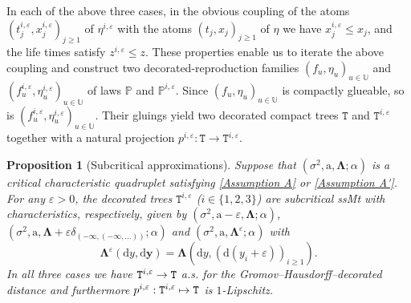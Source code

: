 \documentclass[12pt]{article}
\numberwithin{equation}{section}
\theoremstyle{plain}
\newtheorem{prop}[thm]{Proposition}
\theoremstyle{definition}
\newcommand{\D}{\mathrm{d}}
\newcommand{\Bd}[1]{\boldsymbol{#1}}
\begin{document}
In each of the above three cases, in the obvious coupling of the atoms $(t_j^{i, \varepsilon}, x_j^{i, \varepsilon})_{j \geq 1}$ of $\eta^{i, \varepsilon}$ with the atoms $(t_j, x_j)_{j\geq 1}$ of $\eta$ we have $x_j^{i, \varepsilon} \leq x_j$, and the life times satisfy $z^{i, \varepsilon} \leq z$. These properties enable us to iterate the above coupling and construct two decorated-reproduction families $(f_u, \eta_u)_{u\in\mathbb{U}}$ and $(f_u^{i, \varepsilon}, \eta_u^{i, \varepsilon})_{u\in\mathbb{U}}$ of laws $\mathbb{P}$ and $\mathbb{P}^{i, \varepsilon}$. Since $(f_u, \eta_u)_{u\in\mathbb{U}}$ is compactly glueable, so is $(f_u^{i, \varepsilon}, \eta_u^{i, \varepsilon})_{u\in\mathbb{U}}$. Their gluings yield two decorated compact trees $\mathtt{T}$ and $\mathtt{T}^{i, \varepsilon}$ together with a natural projection
$ p^{i, \varepsilon} : \mathtt{T} \to \mathtt{T}^{i, \varepsilon}.$

\begin{prop}[Subcritical approximations]\label{prop: approximate critical from subcritical} Suppose that  $(\sigma^2, \mathrm{a}, \boldsymbol\Lambda ; \alpha)$ is a critical characteristic quadruplet satisfying \cref{Assumption A} or \cref{Assumption A'}. For any $ \varepsilon >0$, the decorated trees $\mathtt{T}^{i, \varepsilon}$ ($i \in \{1,2,3\}$) are subcritical ssMt with characteristics, respectively, given by  $(\sigma^2, \mathrm{a}-\varepsilon, \Bd\Lambda;\alpha)$, $(\sigma^2, \mathrm{a}, \Bd\Lambda + \varepsilon\delta_{(-\infty, (-\infty,\ldots))};\alpha)$ and $(\sigma^2, \mathrm{a}, \Bd\Lambda^{\varepsilon};\alpha)$ with
    \[\Bd\Lambda^{\varepsilon}(\D y, \D\Bd y) = \Bd\Lambda(\D y, (\D(y_i + \varepsilon))_{i\geq 1}).\]
In all three cases we have  ${\tt T}^{i, \varepsilon} \to \tt T$ a.s. for the Gromov--Hausdorff--decorated distance and furthermore $p^{i, \varepsilon} : {\tt T}^{i, \varepsilon} \mapsto \tt T$ is $1$-Lipschitz.
\end{prop}
\end{document}
